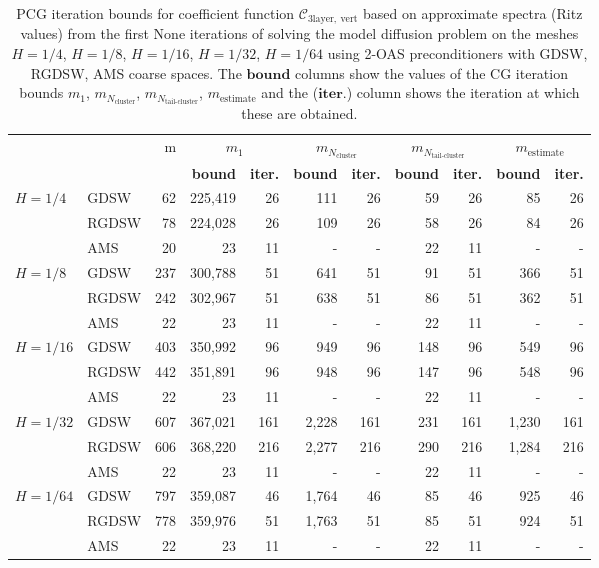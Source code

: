 \begin{table}[H]
\centering
\caption{PCG iteration bounds for coefficient function $\mathcal{C}_{\mathrm{3layer, \ vert}}$ based on approximate spectra (Ritz values) from the first None iterations of solving the model diffusion problem on the meshes $H=1/4$, $H=1/8$, $H=1/16$, $H=1/32$, $H=1/64$ using 2-OAS preconditioners with GDSW, RGDSW, AMS coarse spaces. The $\textbf{bound}$ columns show the values of the CG iteration bounds $m_1$, $m_{N_{\text{cluster}}}$, $m_{N_{\text{tail-cluster}}}$, $m_{\text{estimate}}$ and the ($\textbf{iter.}$) column shows the iteration at which these are obtained.}
\label{tab:cg_iteration_bound_Nc64_N=None}
\begin{tabular}{llrrrrrrrrr}
\toprule
 &  & m & \multicolumn{2}{|c|}{$m_1$} & \multicolumn{2}{|c|}{$m_{N_{\text{cluster}}}$} & \multicolumn{2}{|c|}{$m_{N_{\text{tail-cluster}}}$} & \multicolumn{2}{|c|}{$m_{\text{estimate}}$} \\
 &  & \bfseries  & \bfseries bound & \bfseries iter. & \bfseries bound & \bfseries iter. & \bfseries bound & \bfseries iter. & \bfseries bound & \bfseries iter. \\
\midrule
\multirow[c]{3}{*}{$H=1/4$} & GDSW & 62 & 225,419 & 26 & 111 & 26 & 59 & 26 & 85 & 26 \\
 & RGDSW & 78 & 224,028 & 26 & 109 & 26 & 58 & 26 & 84 & 26 \\
 & AMS & 20 & 23 & 11 & - & - & 22 & 11 & - & - \\
\cline{1-11}
\multirow[c]{3}{*}{$H=1/8$} & GDSW & 237 & 300,788 & 51 & 641 & 51 & 91 & 51 & 366 & 51 \\
 & RGDSW & 242 & 302,967 & 51 & 638 & 51 & 86 & 51 & 362 & 51 \\
 & AMS & 22 & 23 & 11 & - & - & 22 & 11 & - & - \\
\cline{1-11}
\multirow[c]{3}{*}{$H=1/16$} & GDSW & 403 & 350,992 & 96 & 949 & 96 & 148 & 96 & 549 & 96 \\
 & RGDSW & 442 & 351,891 & 96 & 948 & 96 & 147 & 96 & 548 & 96 \\
 & AMS & 22 & 23 & 11 & - & - & 22 & 11 & - & - \\
\cline{1-11}
\multirow[c]{3}{*}{$H=1/32$} & GDSW & 607 & 367,021 & 161 & 2,228 & 161 & 231 & 161 & 1,230 & 161 \\
 & RGDSW & 606 & 368,220 & 216 & 2,277 & 216 & 290 & 216 & 1,284 & 216 \\
 & AMS & 22 & 23 & 11 & - & - & 22 & 11 & - & - \\
\cline{1-11}
\multirow[c]{3}{*}{$H=1/64$} & GDSW & 797 & 359,087 & 46 & 1,764 & 46 & 85 & 46 & 925 & 46 \\
 & RGDSW & 778 & 359,976 & 51 & 1,763 & 51 & 85 & 51 & 924 & 51 \\
 & AMS & 22 & 23 & 11 & - & - & 22 & 11 & - & - \\
\cline{1-11}
\bottomrule
\end{tabular}
\end{table}
